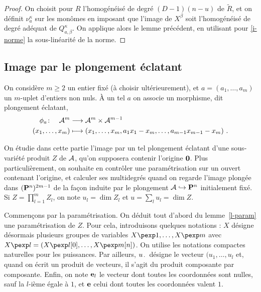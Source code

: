 \begin{proof}
  On choisit pour $R$ l'homogénéisé de degré $(D-1)(n-u)$ de $\widetilde R$, et
  on définit $\nu_a^\kappa$ sur les monômes en imposant que l'image de $X^\beta$
  soit l'homogénéisé de degré adéquat de $Q_{a, \beta}^\kappa$. On applique
  alors le lemme précédent, en utilisant pour \ref{i-norme} la sous-linéarité de
  la norme.
\end{proof}


\subsection{Image par le plongement éclatant}

On considère $m \ge 2$ un entier fixé (à choisir ultérieurement), et $a = (a_1,
\ldots, a_m)$ un $m$-uplet d'entiers non nuls. À un tel $a$ on associe un
morphisme, dit plongement éclatant,
\begin{align*}
  \phi_a \colon\quad \mathcal A^m &\longrightarrow \mathcal A^m\times \mathcal A^{m-1} \\
  (x_1, \ldots, x_m)&\longmapsto (x_1, \ldots, x_m, a_1 x_1 - x_m, \ldots,
  a_{m-1} x_{m-1} - x_m) \text{ .}
\end{align*}

On étudie dans cette partie l'image par un tel plongement éclatant d'une
sous-variété produit $Z$ de $\mathcal A$, qu'on supposera contenir l'origine ${\boldsymbol{0}}$. Plus
particulièrement, on souhaite en contrôler une paramétrisation sur un ouvert
contenant l'origine, et calculer ses multidegrés quand on regarde l'image
plongée dans $({\mathbf{P}}^n)^{2m-1}$ de la façon induite par le plongement $\mathcal A
\hookrightarrow {\mathbf{P}}^n$ initialement fixé. Si $Z = \prod_{l=1}^m Z_l$, on note
$u_l = \dim Z_l$ et $u=\sum_l u_l = \dim Z$.

\medskip
Commençons par la paramétrisation. On déduit tout d'abord du lemme~\ref{l-param}
une paramétrisation de $Z$. Pour cela, introduisons quelques notations : $X$
désigne désormais plusieurs groupes de variables $X\pexp1, \ldots, X\pexp m$
avec $X\pexp l = (X\pexp l[0], \ldots, X\pexp m[n])$. On utilise les notations
compactes naturelles pour les puissances. Par ailleurs, $u_{\,\cdot\,}$ désigne le
vecteur $(u_1, \ldots, u_l$ et, quand on écrit un produit de vecteurs, il s'agit
du produit composante par composante. Enfin, on note ${\mathbf e}_l$ le vecteur dont
toutes les coordonnées sont nulles, sauf la $l$-ième égale à $1$, et ${\mathbf e}$ celui
dont toutes les coordonnées valent $1$.

